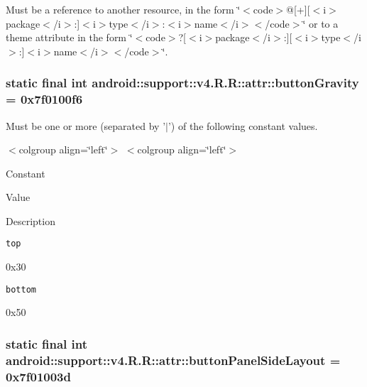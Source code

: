 Must be a reference to another resource, in the form \char`\"{}$<$code$>$@\mbox{[}+\mbox{]}\mbox{[}$<$i$>$package$<$/i$>$:\mbox{]}$<$i$>$type$<$/i$>$:$<$i$>$name$<$/i$>$$<$/code$>$\char`\"{} or to a theme attribute in the form \char`\"{}$<$code$>$?\mbox{[}$<$i$>$package$<$/i$>$:\mbox{]}\mbox{[}$<$i$>$type$<$/i$>$:\mbox{]}$<$i$>$name$<$/i$>$$<$/code$>$\char`\"{}. \hypertarget{classandroid_1_1support_1_1v4_1_1_r_1_1attr_f23b93746c54f05a9ebfb9036d9f02b6}{
\subsubsection[{buttonGravity}]{\setlength{\rightskip}{0pt plus 5cm}static final int android::support::v4.R.R::attr::buttonGravity = 0x7f0100f6}}
\label{classandroid_1_1support_1_1v4_1_1_r_1_1attr_f23b93746c54f05a9ebfb9036d9f02b6}


Must be one or more (separated by '$|$') of the following constant values. \begin{TabularC}{0}
\hline
\end{TabularC}
$<$colgroup align=\char`\"{}left\char`\"{}$>$ $<$colgroup align=\char`\"{}left\char`\"{}$>$ 

Constant

Value

Description 

{\tt top}

0x30

{\tt bottom}

0x50\hypertarget{classandroid_1_1support_1_1v4_1_1_r_1_1attr_aecddbe1934bae0fb271e5b463621db9}{
\subsubsection[{buttonPanelSideLayout}]{\setlength{\rightskip}{0pt plus 5cm}static final int android::support::v4.R.R::attr::buttonPanelSideLayout = 0x7f01003d}}
\label{classandroid_1_1support_1_1v4_1_1_r_1_1attr_aecddbe1934bae0fb271e5b463621db9}



